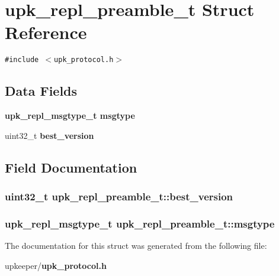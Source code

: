 \section{upk\_\-repl\_\-preamble\_\-t Struct Reference}
\label{structupk__repl__preamble__t}
{\tt \#include $<$upk\_\-protocol.h$>$}

\subsection*{Data Fields}
\begin{CompactItemize}
\item 
\bf{upk\_\-repl\_\-msgtype\_\-t} \bf{msgtype}
\item 
uint32\_\-t \bf{best\_\-version}
\end{CompactItemize}


\subsection{Field Documentation}
\subsubsection{\setlength{\rightskip}{0pt plus 5cm}uint32\_\-t \bf{upk\_\-repl\_\-preamble\_\-t::best\_\-version}}\label{structupk__repl__preamble__t_8538ea0f76468717e06fcbc6af57b748}


\subsubsection{\setlength{\rightskip}{0pt plus 5cm}\bf{upk\_\-repl\_\-msgtype\_\-t} \bf{upk\_\-repl\_\-preamble\_\-t::msgtype}}\label{structupk__repl__preamble__t_7647bed099558957eb158ba68bcf0a36}




The documentation for this struct was generated from the following file:\begin{CompactItemize}
\item 
upkeeper/\bf{upk\_\-protocol.h}\end{CompactItemize}
